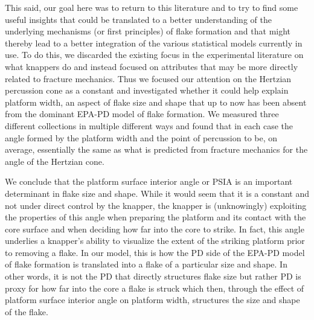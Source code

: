 \documentclass[10pt,letterpaper]{article}
\begin{document}
This said, our goal here was to return to this literature and to try to
find some useful insights that could be translated to a better
understanding of the underlying mechanisms (or first principles) of
flake formation and that might thereby lead to a better integration of
the various statistical models currently in use. To do this, we
discarded the existing focus in the experimental literature on what
knappers do and instead focused on attributes that may be more directly
related to fracture mechanics. Thus we focused our attention on the
Hertzian percussion cone as a constant and investigated whether it could
help explain platform width, an aspect of flake size and shape that up
to now has been absent from the dominant EPA-PD model of flake
formation. We measured three different collections in multiple different
ways and found that in each case the angle formed by the platform width
and the point of percussion to be, on average, essentially the same as
what is predicted from fracture mechanics for the angle of the Hertzian
cone.

We conclude that the platform surface interior angle or PSIA is an
important determinant in flake size and shape. While it would seem that
it is a constant and not under direct control by the knapper, the
knapper is (unknowingly) exploiting the properties of this angle when
preparing the platform and its contact with the core surface and when
deciding how far into the core to strike. In fact, this angle underlies
a knapper's ability to visualize the extent of the striking platform
prior to removing a flake. In our model, this is how the PD side of the
EPA-PD model of flake formation is translated into a flake of a
particular size and shape. In other words, it is not the PD that
directly structures flake size but rather PD is proxy for how far into
the core a flake is struck which then, through the effect of platform
surface interior angle on platform width, structures the size and shape
of the flake.
\end{document}
